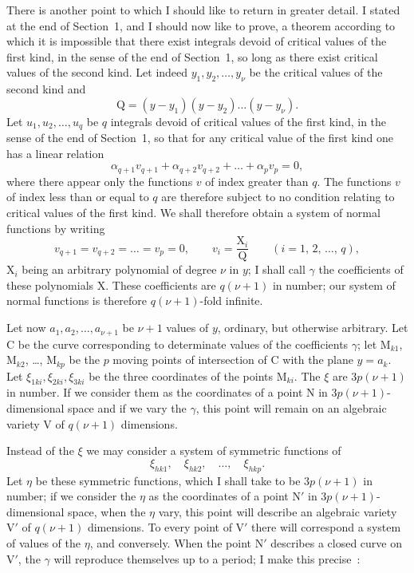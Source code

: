 \documentclass{article}
\begin{document}
There is another point to which I should like to return in greater detail. I stated at the end of Section~1, and I should now like to prove, a theorem according to which it is impossible that there exist integrals devoid of critical values of the first kind, in the sense of the end of Section~1, so long as there exist critical values of the second kind. Let indeed $y_{1}, y_{2}, \ldots, y_{\nu}$ be the critical values of the second kind and
\[
\mathrm{Q} = (y - y_{1})(y - y_{2})\ldots(y - y_{\nu}).
\]
Let $u_{1}, u_{2}, \ldots, u_{q}$ be $q$ integrals devoid of critical values of the first kind, in the sense of the end of Section~1, so that for any critical value of the first kind one has a linear relation
\[
\alpha_{q+1} v_{q+1} + \alpha_{q+2} v_{q+2} + \ldots + \alpha_{p} v_{p} = 0,
\]
where there appear only the functions $v$ of index greater than $q$. The functions $v$ of index less than or equal to $q$ are therefore subject to no condition relating to critical values of the first kind. We shall therefore obtain a system of normal functions by writing
\[
v_{q+1} = v_{q+2} = \ldots = v_{p} = 0, \qquad v_{i} = \frac{\mathrm{X}_{i}}{\mathrm{Q}} \qquad (i = 1,\, 2,\, \ldots,\, q),
\]
$\mathrm{X}_{i}$ being an arbitrary polynomial of degree $\nu$ in $y$; I shall call $\gamma$ the coefficients of these polynomials $\mathrm{X}$. These coefficients are $q(\nu + 1)$ in number; our system of normal functions is therefore $q(\nu + 1)$-fold infinite.

Let now $a_{1}, a_{2}, \ldots, a_{\nu+1}$ be $\nu + 1$ values of $y$, ordinary, but otherwise arbitrary. Let $\mathrm{C}$ be the curve corresponding to determinate values
of the coefficients $\gamma$; let $\mathrm{M}_{k1}$, $\mathrm{M}_{k2}$, \dots, $\mathrm{M}_{kp}$ be the $p$ moving points of intersection of $\mathrm{C}$ with the plane $y = a_{k}$. Let $\xi_{1ki}, \xi_{2ki}, \xi_{3ki}$ be the three coordinates of the points $\mathrm{M}_{ki}$. The $\xi$ are $3p(\nu+1)$ in number. If we consider them as the coordinates of a point $\mathrm{N}$ in $3p(\nu+1)$-dimensional space and if we vary the $\gamma$, this point will remain on an algebraic variety $\mathrm{V}$ of $q(\nu+1)$ dimensions.

Instead of the $\xi$ we may consider a system of symmetric functions of
\[
\xi_{hk1}, \quad \xi_{hk2}, \quad \dots, \quad \xi_{hkp}.
\]
Let $\eta$ be these symmetric functions, which I shall take to be $3p(\nu+1)$ in number; if we consider the $\eta$ as the coordinates of a point $\mathrm{N}'$ in $3p(\nu+1)$-dimensional space, when the $\eta$ vary, this point will describe an algebraic variety $\mathrm{V}'$ of $q(\nu+1)$ dimensions. To every point of $\mathrm{V}'$ there will correspond a system of values of the $\eta$, and conversely. When the point $\mathrm{N}'$ describes a closed curve on $\mathrm{V}'$, the $\gamma$ will reproduce themselves up to a period; I make this precise~:
\end{document}
